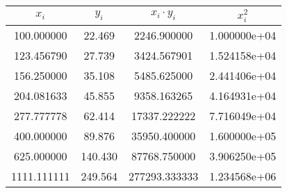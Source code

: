 \begin{tabular}{cccc}
\toprule
      $x_i$ &   $y_i$ &  $x_i \cdot y_i$ &      $x_i^2$ \\
\midrule
 100.000000 &  22.469 &      2246.900000 & 1.000000e+04 \\
 123.456790 &  27.739 &      3424.567901 & 1.524158e+04 \\
 156.250000 &  35.108 &      5485.625000 & 2.441406e+04 \\
 204.081633 &  45.855 &      9358.163265 & 4.164931e+04 \\
 277.777778 &  62.414 &     17337.222222 & 7.716049e+04 \\
 400.000000 &  89.876 &     35950.400000 & 1.600000e+05 \\
 625.000000 & 140.430 &     87768.750000 & 3.906250e+05 \\
1111.111111 & 249.564 &    277293.333333 & 1.234568e+06 \\
\bottomrule
\end{tabular}
